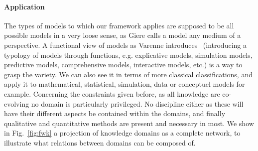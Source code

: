 \documentclass[runningheads,a4paper]{llncs2e/llncs}
\begin{document}
\paragraph{Application}


The types of models to which our framework applies are supposed to be all possible models in a very loose sense, as Giere calls a model any medium of a perspective. A functional view of models as Varenne introduces~\cite{varenne2010simulations} (introducing a typology of models through functions, e.g. explicative models, simulation models, predictive models, comprehensive models, interactive models, etc.) is a way to grasp the variety. We can also see it in terms of more classical classifications, and apply it to mathematical, statistical, simulation, data or conceptuel models for example. Concerning the constraints given before, as all knowledge are co-evolving no domain is particularly privileged. No discipline either as these will have their different aspects be contained within the domains, and finally qualitative and quantitative methods are present and necessary in most. We show in Fig.~\ref{fig:fwk} a projection of knowledge domains as a complete network, to illustrate what relations between domains can be composed of.
\end{document}
